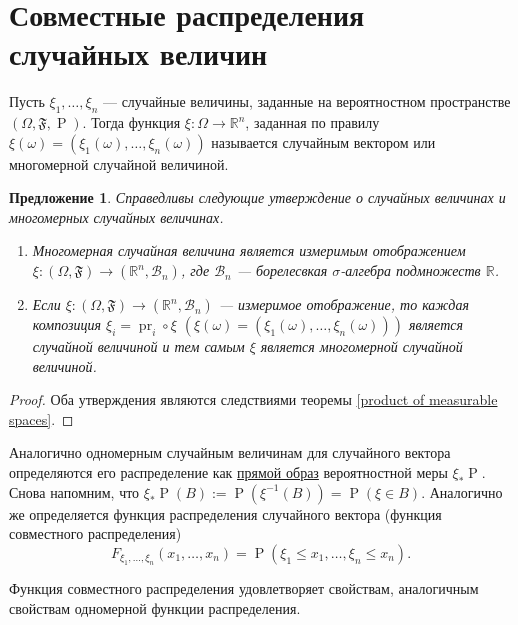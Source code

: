 \documentclass[12pt]{article}
\newtheorem{proposition}[theorem]{Предложение}
\numberwithin{theorem}{section}
\theoremstyle{definition}
\newcommand{\defin}[2]{\hypertarget{#2}{{\color{red} #1}}}
\newcommand{\RR}{\mathbb{R}}
\newcommand{\calB}{\mathcal{B}}
\newcommand{\pr}{\operatorname{pr}}
\newcommand{\prob}{\operatorname{P}}
\newcommand{\events}{\mathfrak{F}}
\begin{document}
	\section{Совместные распределения случайных величин}
	
	Пусть $ \xi_1, \ldots, \xi_n $ --- случайные величины, заданные на вероятностном пространстве 
	$ (\Omega, \events, \prob) $. Тогда функция $ \xi \colon \Omega \to \RR^n $, 
	заданная по правилу $ \xi(\omega) = (\xi_1(\omega), \ldots, \xi_n(\omega)) $
	называется \defin{случайным вектором}{random-vector} или 
	\defin{многомерной случайной величиной}{higher-dimensional-random-variable}.
	
	\begin{proposition}
		Справедливы следующие утверждение о случайных величинах и многомерных случайных величинах.
		\begin{enumerate}
			\item Многомерная случайная величина является измеримым отображением 
			$ \xi \colon (\Omega, \events) \to (\RR^n, \calB_n) $,
			где $ \calB_n $ --- борелесвкая $ \sigma $-алгебра подмножеств $ \RR $.
			\item Если $ \xi \colon (\Omega, \events) \to (\RR^n, \calB_n) $ --- измеримое отображение,
			то каждая композиция $ \xi_i = \pr_i \circ \xi $ $ (\xi(\omega) = (\xi_1(\omega), \ldots, \xi_n(\omega))) $
			является случайной величиной и тем самым $ \xi $ является многомерной случайной величиной.
		\end{enumerate}
	\end{proposition}
	
	\begin{proof}
		Оба утверждения являются следствиями теоремы \ref{product of measurable spaces}.
	\end{proof}
	
	Аналогично одномерным случайным величинам для случайного вектора определяются
	его \defin{распределение}{joint-distribution} как \hyperlink{pushforward-measure}{прямой образ} 
	вероятностной меры $ \xi_*\prob $. Снова напомним, что $ \xi_*\prob(B) := \prob(\xi^{-1}(B)) = \prob(\xi \in B) $.
	Аналогично же определяется 
	\defin{функция распределения случайного вектора (функция совместного распределения)}
	{joint--cumulative-distribution-function}
	$$ F_{\xi_1, \ldots, \xi_n}(x_1, \ldots, x_n) = \prob(\xi_1 \leqslant x_1, \ldots, \xi_n \leqslant x_n). $$
	
	Функция совместного распределения удовлетворяет свойствам, аналогичным свойствам одномерной функции распределения.
	
\end{document}
